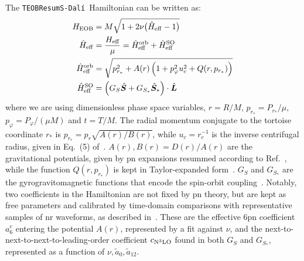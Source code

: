 \documentclass[prd,amssymb,amsmath,amsfonts,nofootinbib,reprint,showpacs,longbibliography]{revtex4-1}
\newcommand{\dali}[0]{\texttt{TEOBResumS-Dalí}}
\begin{document}
The \dali~Hamiltonian can be written as:
\begin{subequations}
\begin{align}
H_{\rm EOB} &= M \sqrt{1 + 2 \nu \bigl(\hat{H}_{\rm eff} - 1\bigr)} \\
\hat{H}_{\rm eff} &= \dfrac{H_{\rm eff}}{\mu} = \hat{H}_{\rm eff}^{\rm orb} + \hat{H}_{\rm eff}^{\rm SO} \\
\hat{H}_{\rm eff}^{\rm orb} &= \sqrt{p_{r_*}^2 + A(r) \left(1 + p_\varphi^2 u_c^2 + Q(r, p_{r_*})\right)} \\
\hat{H}_{\rm eff}^{\rm SO}  &= \left(G_S \hat{\bm{S}} + G_{S_*} \hat{\bm{S}}_*\right) \cdot \hat{\bm{L}} \ \,
\end{align}
\end{subequations}
where we are using dimensionless phase space variables, $r = R/M$, $p_{r_*} = P_{r_*}/\mu$, $p_\varphi =
P_\varphi/(\mu M)$ and $t = T/M$. The radial momentum conjugate to the tortoise coordinate $r_*$ is
$p_{r_*} = p_r \sqrt{A(r)/B(r)}$, while $u_c = r_c^{-1}$ is the inverse centrifugal radius, given in
Eq.~(5) of~\cite{Nagar:2024oyk}. $A(r), B(r) = D(r)/A(r)$ are the gravitational potentials,
given by \ac{pn} expansions resummed according to Ref.~\cite{Nagar:2024oyk}, while the function $Q(r, p_{r_*})$
is kept in Taylor-expanded form~\cite{Nagar:2021xnh, Nagar:2024dzj}. $G_S$ and $G_{S_*}$ are the 
gyrogravitomagnetic functions that encode the spin-orbit coupling~\cite{Damour:2014sva}. Notably,
two coefficients in the Hamiltonian are not fixed by \ac{pn} theory, but are kept as free parameters
and calibrated by time-domain comparisons with representative samples of \ac{nr} waveforms, as described
in~\cite{Nagar:2024oyk}. These are the effective 6\ac{pn} coefficient $a_6^c$ entering the potential $A(r)$,
represented by a fit against $\nu$, and the next-to-next-to-next-to-leading-order coefficient $c_{\rm{N}^3\rm{LO}}$
found in both $G_S$ and $G_{S_*}$, represented as a function of $\nu, \tilde{a}_0, \tilde{a}_{12}$.
\end{document}
